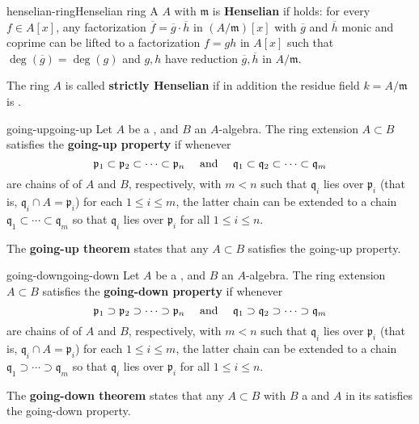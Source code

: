 \begin{topic}{henselian-ring}{Henselian ring}
    A  $A$ with  $\mathfrak{m}$ is \textbf{Henselian} if  holds: for every  $f \in A[x]$, any factorization $\overline{f} = \overline{g} \cdot \overline{h}$ in $(A/\mathfrak{m})[x]$ with $\overline{g}$ and $\overline{h}$ monic and coprime can be lifted to a factorization $f = gh$ in $A[x]$ such that $\deg(\overline{g}) = \deg(g)$ and $g, h$ have reduction $\overline{g}, \overline{h}$ in $A/\mathfrak{m}$.
    
    The ring $A$ is called \textbf{strictly Henselian} if in addition the residue field $k = A/\mathfrak{m}$ is .
\end{topic}

\begin{topic}{going-up}{going-up}
    Let $A$ be a , and $B$ an $A$-algebra. The ring extension $A \subset B$ satisfies the \textbf{going-up property} if whenever
    \[ \mathfrak{p}_1 \subset \mathfrak{p}_2 \subset \cdots \subset \mathfrak{p}_n \quad \textup{ and } \quad \mathfrak{q}_1 \subset \mathfrak{q}_2 \subset \cdots \subset \mathfrak{q}_m \]
    are chains of  of $A$ and $B$, respectively, with $m < n$ such that $\mathfrak{q}_i$ lies over $\mathfrak{p}_i$ (that is, $\mathfrak{q}_i \cap A = \mathfrak{p}_i$) for each $1 \le i \le m$, the latter chain can be extended to a chain $\mathfrak{q}_1 \subset \cdots \subset \mathfrak{q}_m$ so that $\mathfrak{q}_i$ lies over $\mathfrak{p}_i$ for all $1 \le i \le n$.
    
    The \textbf{going-up theorem} states that any  $A \subset B$ satisfies the going-up property.
\end{topic}

\begin{topic}{going-down}{going-down}
    Let $A$ be a , and $B$ an $A$-algebra. The ring extension $A \subset B$ satisfies the \textbf{going-down property} if whenever
    \[ \mathfrak{p}_1 \supset \mathfrak{p}_2 \supset \cdots \supset \mathfrak{p}_n \quad \textup{ and } \quad \mathfrak{q}_1 \supset \mathfrak{q}_2 \supset \cdots \supset \mathfrak{q}_m \]
    are chains of  of $A$ and $B$, respectively, with $m < n$ such that $\mathfrak{q}_i$ lies over $\mathfrak{p}_i$ (that is, $\mathfrak{q}_i \cap A = \mathfrak{p}_i$) for each $1 \le i \le m$, the latter chain can be extended to a chain $\mathfrak{q}_1 \supset \cdots \supset \mathfrak{q}_m$ so that $\mathfrak{q}_i$ lies over $\mathfrak{p}_i$ for all $1 \le i \le n$.
    
    The \textbf{going-down theorem} states that any  $A \subset B$ with $B$ a  and $A$  in its  satisfies the going-down property.
\end{topic}

